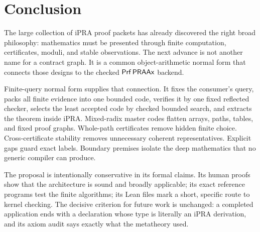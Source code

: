 \section{Conclusion}

The large collection of iPRA proof packets has already discovered the right
broad philosophy: mathematics must be presented through finite computation,
certificates, moduli, and stable observations.  The next advance is not another
name for a contract graph.  It is a common object-arithmetic normal form that
connects those designs to the checked \(\mathsf{Prf}\,\mathsf{PRAAx}\) backend.

Finite-query normal form supplies that connection.  It fixes the consumer's
query, packs all finite evidence into one bounded code, verifies it by one fixed
reflected checker, selects the least accepted code by checked bounded search,
and extracts the theorem inside iPRA.  Mixed-radix master codes flatten arrays,
paths, tables, and fixed proof graphs.  Whole-path certificates remove hidden
finite choice.  Cross-certificate stability removes unnecessary coherent
representatives.  Explicit gaps guard exact labels.  Boundary premises isolate
the deep mathematics that no generic compiler can produce.

The proposal is intentionally conservative in its formal claims.  Its human
proofs show that the architecture is sound and broadly applicable; its exact
reference programs test the finite algorithms; its Lean files mark a short,
specific route to kernel checking.  The decisive criterion for future work is
unchanged: a completed application ends with a declaration whose type is
literally an iPRA derivation, and its axiom audit says exactly what the
metatheory used.
